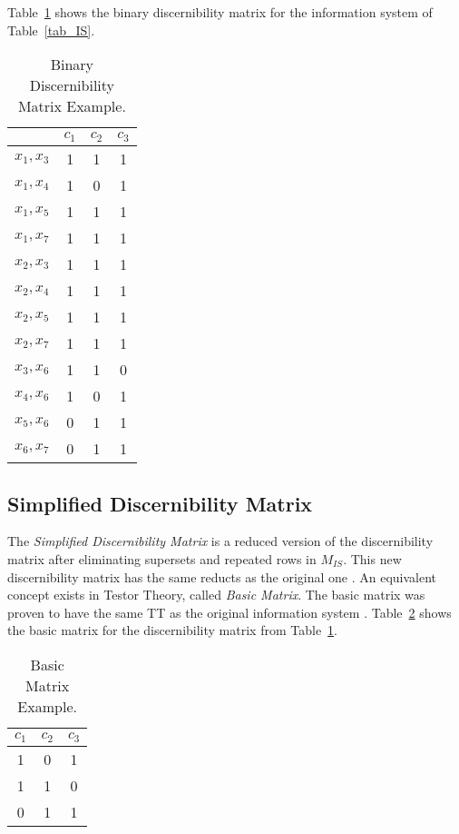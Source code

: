 \documentclass[authoryear,11pt]{elsarticle}
\begin{document}
  Table~\ref{tab_BDM} shows the binary discernibility matrix for the information system of Table~\ref{tab_IS}.  
  
  \begin{table}[htb]
		\caption{Binary Discernibility Matrix Example.} \label{tab_BDM}
		\centering
 	\begin{tabular}{cccc}
 		& $c_1$ & $c_2$ & $c_3$\\
 		\hline
		$x_1,x_3$ & 1 & 1 & 1 \\
		$x_1,x_4$ & 1 & 0 & 1 \\
		$x_1,x_5$ & 1 & 1 & 1 \\
		$x_1,x_7$ & 1 & 1 & 1 \\
		$x_2,x_3$ & 1 & 1 & 1 \\
		$x_2,x_4$ & 1 & 1 & 1 \\
		$x_2,x_5$ & 1 & 1 & 1 \\
		$x_2,x_7$ & 1 & 1 & 1 \\
		$x_3,x_6$ & 1 & 1 & 0 \\
		$x_4,x_6$ & 1 & 0 & 1 \\
		$x_5,x_6$ & 0 & 1 & 1 \\
		$x_6,x_7$ & 0 & 1 & 1 
 	\end{tabular}             
  \end{table}
  
\subsection{Simplified Discernibility Matrix}
  The \textit{Simplified Discernibility Matrix} is a reduced version of the discernibility matrix after
  eliminating supersets and repeated rows in $M_{IS}$. This new discernibility matrix has the same reducts
  as the original one \citep{Yao09}. An equivalent concept exists in Testor Theory, called 
  \textit{Basic Matrix}. The basic matrix was proven to have the same TT as the original information
  system \citep{Lazo01}. Table~\ref{tab_SDM} shows the basic matrix for the
  discernibility matrix from Table~\ref{tab_BDM}.
  
     \begin{table}[htb]
		\caption{Basic Matrix Example.} \label{tab_SDM}
		\centering
 	\begin{tabular}{ccc}
 		$c_1$ & $c_2$ & $c_3$\\
 		\hline
		1 & 0 & 1 \\
		1 & 1 & 0 \\
		0 & 1 & 1
 	\end{tabular}             
 \end{table}  
    
\end{document}
